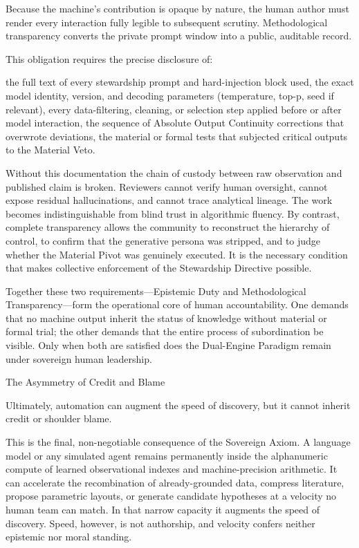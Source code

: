 Because the machine’s contribution is opaque by nature, the human author must render every interaction fully legible to subsequent scrutiny. Methodological transparency converts the private prompt window into a public, auditable record.

This obligation requires the precise disclosure of:

the full text of every stewardship prompt and hard-injection block used,
the exact model identity, version, and decoding parameters (temperature, top-p, seed if relevant),
every data-filtering, cleaning, or selection step applied before or after model interaction,
the sequence of Absolute Output Continuity corrections that overwrote deviations,
the material or formal tests that subjected critical outputs to the Material Veto.

Without this documentation the chain of custody between raw observation and published claim is broken. Reviewers cannot verify human oversight, cannot expose residual hallucinations, and cannot trace analytical lineage. The work becomes indistinguishable from blind trust in algorithmic fluency. By contrast, complete transparency allows the community to reconstruct the hierarchy of control, to confirm that the generative persona was stripped, and to judge whether the Material Pivot was genuinely executed. It is the necessary condition that makes collective enforcement of the Stewardship Directive possible.

Together these two requirements—Epistemic Duty and Methodological Transparency—form the operational core of human accountability. One demands that no machine output inherit the status of knowledge without material or formal trial; the other demands that the entire process of subordination be visible. Only when both are satisfied does the Dual-Engine Paradigm remain under sovereign human leadership.

The Asymmetry of Credit and Blame

Ultimately, automation can augment the speed of discovery, but it cannot inherit credit or shoulder blame.

This is the final, non-negotiable consequence of the Sovereign Axiom. A language model or any simulated agent remains permanently inside the alphanumeric compute of learned observational indexes and machine-precision arithmetic. It can accelerate the recombination of already-grounded data, compress literature, propose parametric layouts, or generate candidate hypotheses at a velocity no human team can match. In that narrow capacity it augments the speed of discovery. Speed, however, is not authorship, and velocity confers neither epistemic nor moral standing.

